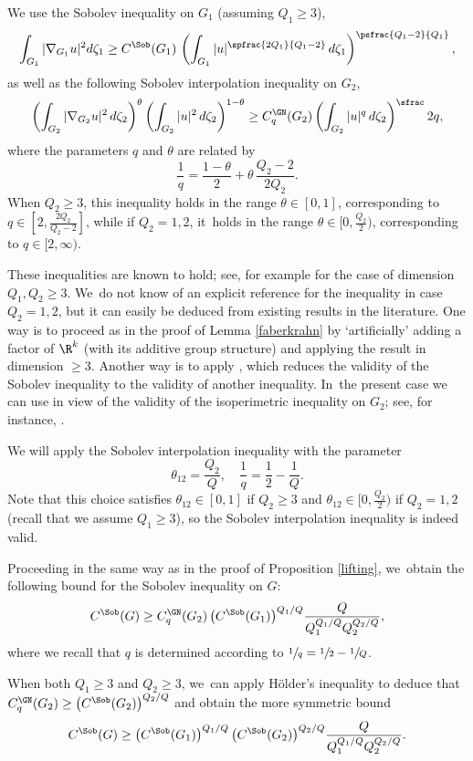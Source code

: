 We use the Sobolev inequality on $G_1$ (assuming $Q_1 \geq 3$),
\[
\int_{G_1} |\nabla_{G_1} u|^2 d\zeta_1 \geq C^\Sob(G_1) \,\left(\int_{G_1} |u|^\spfrac{2Q_1}{Q_1 - 2}\,d\zeta_1\right)^\psfrac{Q_1-2}{Q_1},
\]
as well as the following Sobolev interpolation inequality on $G_2$,
\[
\left(\int_{G_2} |\nabla_{G_2} u|^2\,d\zeta_2\right)^{\theta} \left(\int_{G_2} | u|^2\,d \zeta_2\right)^{1-\theta}
\geq C^\GN_q(G_2) \left(\int_{G_2} |u|^{q} \,d\zeta_2\right)^\sfrac2 {q},
\]
where the parameters $q$ and $\theta$ are related by
\[
\frac 1 q = \frac {1-\theta}{2} + \theta \,\frac{Q_2-2}{2Q_2}.
\]
When $Q_2\geq 3$, this inequality holds in the range $\theta\in[0,1]$, corresponding to $q\in [2,\frac{2Q_2}{Q_2-2}]$, while if $Q_2=1,2$, it~holds in the range $\theta\in[0,\frac{Q_2}2)$, corresponding to $q\in[2,\infty)$.

These inequalities are known to hold; see, for example \cite{Fo, Va} for the case of dimension $Q_1,Q_2\geq 3$. We~do not know of an explicit reference for the inequality in case $Q_2=1,2$, but it can easily be deduced from existing results in the literature. One way is to proceed as in the proof of Lemma \ref{faberkrahn} by `artificially' adding a factor of $\R^k$ (with its additive group structure) and applying the result in dimension $\geq 3$. Another way is to apply \cite[Cor.\,3.6]{BaCoLeSC}, which reduces the validity of the Sobolev inequality to the validity of another inequality. In~the present case we can use \cite[Th.\,8.1]{BaCoLeSC} in view of the validity of the isoperimetric inequality on $G_2$; see, for instance, \cite[Prop.\,1.17 and the following remarks]{HaKo}.

We will apply the Sobolev interpolation inequality with the parameter
\[
\theta_{12} = \frac{Q_2}Q,\quad \frac 1q = \frac 12 - \frac{1}{Q}.
\]
Note that this choice satisfies $\theta_{12}\in[0,1]$ if $Q_2\geq 3$ and $\theta_{12}\in[0,\frac{Q_2}{2})$ if $Q_2=1,2$ (recall that we assume $Q_1\geq 3$), so the Sobolev interpolation inequality is indeed valid.

Proceeding in the same way as in the proof of Proposition \ref{lifting}, we~obtain the following bound for the Sobolev inequality on $G$:
\begin{equation}\label{eq:asym}
C^\Sob(G)\geq C^\GN_q(G_2)\,\bigl(C^\Sob (G_1)\bigr)^{Q_1/Q} \frac{Q} {Q_1^{Q_1/Q} Q_2^{Q_2/Q}},
\end{equation}
where we recall that $q$ is determined according to $\sfrac 1q = \sfrac 12 - \sfrac{1}{Q}$.

When both $Q_1\geq 3$ and $Q_2 \geq 3$, we~can apply Hölder's inequality to deduce that $C^\GN_q(G_2)\geq \bigl(C^\Sob(G_2)\bigr)^{Q_2/Q}$ and obtain the more symmetric bound
\begin{equation}\label{eq:sym}
C^\Sob(G)\geq \bigl(C^\Sob(G_1)\bigr)^{Q_1/Q}\,\bigl(C^\Sob(G_2)\bigr)^{Q_2/Q} \frac{Q} {Q_1^{Q_1/Q} Q_2^{Q_2/Q}}.
\end{equation}


